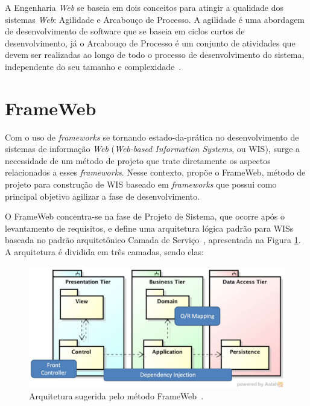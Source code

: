 A Engenharia \textit{Web} se baseia em dois conceitos para atingir a qualidade dos sistemas \textit{Web}: Agilidade e Arcabouço de Processo.
A agilidade é uma abordagem de desenvolvimento de software que se baseia em ciclos curtos de desenvolvimento,
já o Arcabouço de Processo é um conjunto de atividades que devem ser realizadas ao longo de todo o processo
de desenvolvimento do sistema, independente do seu tamanho e complexidade~\cite{beder:2017}.



\section{FrameWeb}
\label{sec-fundteo-frameweb}

Com o uso de \textit{frameworks} se tornando estado-da-prática no  desenvolvimento 
de sistemas de informação \textit{Web} (\textit{Web-based Information Systems}, ou WIS), surge a necessidade de um método de projeto
que trate diretamente os aspectos relacionados a esses \textit{frameworks}.
Nesse contexto,  propõe o FrameWeb, método de projeto 
para construção de WIS baseado em \textit{frameworks} que possui como principal 
objetivo agilizar a fase de desenvolvimento.

O FrameWeb concentra-se na fase de Projeto de Sistema, que ocorre após o levantamento
de requisitos, e define uma arquitetura lógica padrão para WISs baseada no padrão 
arquitetônico Camada de Serviço~\cite{fowler:2002}, apresentada na Figura \ref{fig-arquitetura-frameweb}.
A arquitetura é dividida em três camadas, sendo elas:

\begin{figure}
    \centering
    \includegraphics[width=.9\textwidth]{figuras/fig-arquitetura-frameweb.png} 
    \caption{Arquitetura sugerida pelo método FrameWeb~\cite{souza:2020}.}
    \label{fig-arquitetura-frameweb}
\end{figure}


